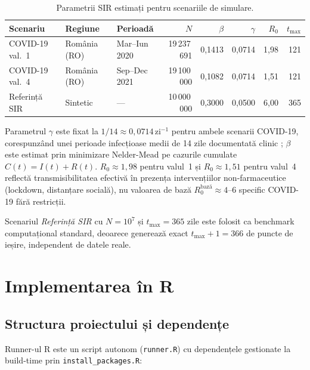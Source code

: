 \begin{table}[htbp]
\centering
\caption{Parametrii SIR estimați pentru scenariile de simulare.}
\label{tab:parametri_sir}
\begin{tabular}{lllrrrrr}
\toprule
\textbf{Scenariu} & \textbf{Regiune} & \textbf{Perioadă} &
$N$ & $\beta$ & $\gamma$ & $R_0$ & $t_{\max}$ \\
\midrule
COVID-19 val.~1 & România (RO) & Mar--Iun 2020
  & 19\,237\,691 & 0{,}1413 & 0{,}0714 & 1{,}98 & 121 \\
COVID-19 val.~4 & România (RO) & Sep--Dec 2021
  & 19\,100\,000 & 0{,}1082 & 0{,}0714 & 1{,}51 & 121 \\
Referință SIR   & Sintetic     & ---
  & 10\,000\,000 & 0{,}3000 & 0{,}0500 & 6{,}00 & 365 \\
\bottomrule
\end{tabular}
\end{table}

Parametrul $\gamma$ este fixat la $1/14 \approx 0{,}0714\,\text{zi}^{-1}$ pentru
ambele scenarii COVID-19, corespunzând unei perioade infecțioase medii de
14 zile documentată clinic \cite{he2020temporal}; $\beta$ este estimat prin
minimizare Nelder-Mead pe cazurile cumulate $C(t) = I(t)+R(t)$.
$R_0 \approx 1{,}98$ pentru valul~1 și $R_0 \approx 1{,}51$ pentru valul~4
reflectă transmisibilitatea efectivă în prezența intervențiilor
non-farmaceutice (lockdown, distanțare socială), nu valoarea de bază
$R_0^{\text{bază}} \approx 4$--$6$ specific COVID-19 fără restricții.

Scenariul \emph{Referință SIR} cu $N = 10^7$ și $t_{\max} = 365$ zile este
folosit ca benchmark computațional standard, deoarece generează exact
$t_{\max}+1 = 366$ de puncte de ieșire, independent de datele reale.

\section{Implementarea în R}
\label{sec:implementare_r}

\subsection{Structura proiectului și dependențe}
\label{subsec:r_structura}

Runner-ul R este un script autonom (\texttt{runner.R}) cu dependențele
gestionate la build-time prin \texttt{install\_packages.R}:

